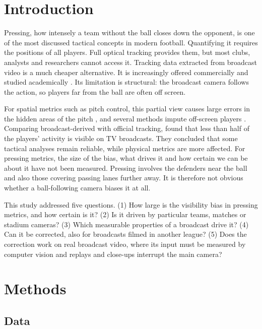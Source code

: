 \documentclass[]{interact}
\begin{document}
\section{Introduction}

Pressing, how intensely a team without the ball closes down the opponent, is one of the most discussed tactical
concepts in modern football. Quantifying it requires the positions of all players. Full optical tracking provides
them, but most clubs, analysts and researchers cannot access it. Tracking data extracted from broadcast video is a much
cheaper alternative. It is increasingly offered commercially and studied academically
\citep{somers2024gsr,smf2025broadcast}. Its limitation is structural: the broadcast camera follows the action, so
players far from the ball are often off screen.

For spatial metrics such as pitch control, this partial view causes large errors in the hidden areas of the pitch
\citep{offscreen2026}, and several methods impute off-screen players
\citep{omidshafiei2022graphimputer,rsos2025continuous,offscreen2026}. Comparing broadcast-derived with official
tracking, \citet{smf2025broadcast} found that less than half of the players' activity is visible on TV broadcasts.
They concluded that some tactical analyses remain reliable, while physical metrics are more affected. For pressing
metrics, the size of the bias, what drives it and how certain we can be about it have not been measured. Pressing
involves the defenders near the ball and also those covering passing lanes further away. It is therefore not obvious
whether a ball-following camera biases it at all.

This study addressed five questions. (1) How large is the visibility bias in pressing metrics, and how certain is it?
(2) Is it driven by particular teams, matches or stadium cameras? (3) Which measurable properties of a broadcast drive
it? (4) Can it be corrected, also for broadcasts filmed in another league? (5) Does the correction work on real
broadcast video, where its input must be measured by computer vision and replays and close-ups interrupt the main
camera?

\section{Methods}

\subsection{Data}
\end{document}
